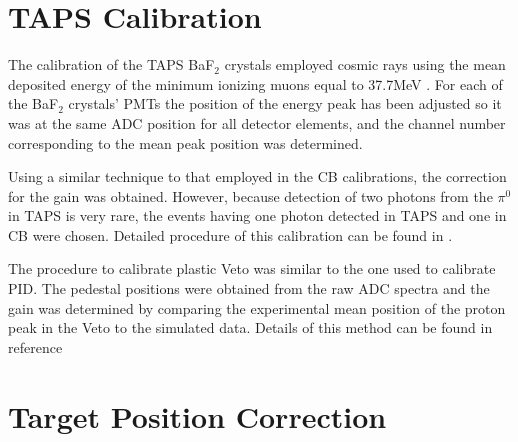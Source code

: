 \section{TAPS Calibration}

\indent The calibration of the TAPS BaF$_{2}$ crystals employed cosmic rays using the mean deposited energy of the minimum ionizing muons equal to 37.7MeV \cite{roebig}. For each of the BaF$_{2}$ crystals' PMTs the position of the energy peak has been adjusted so it was at the same ADC position for all detector elements, and the channel number corresponding to the mean peak position was determined.

\indent Using a similar technique to that employed in the CB calibrations, the correction for the gain was obtained. However, because detection of two photons from the $\pi^{0}$ in TAPS is very rare, the events having one photon detected in TAPS and one in CB were chosen. Detailed procedure of this calibration can be found in \cite{lemmer}.

\indent The procedure to calibrate plastic Veto was similar to the one used to calibrate PID. The pedestal positions were obtained from the raw ADC spectra and the gain was determined by comparing the experimental mean position of the proton peak in the Veto to the simulated data. Details of this method can be found in reference \cite{gessler}

\section{Target Position Correction}


   


